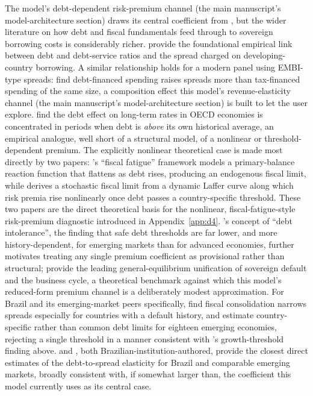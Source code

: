 \documentclass[11pt,a4paper]{article}
\begin{document}
The model's debt-dependent risk-premium channel (the main manuscript's model-architecture section) draws its central coefficient from \citet{baldaccikumar2010}, but the wider literature on how debt and fiscal fundamentals feed through to sovereign borrowing costs is considerably richer. \citet{edwards1984,edwards1986} provide the foundational empirical link between debt and debt-service ratios and the spread charged on developing-country borrowing. A similar relationship holds for a modern panel using EMBI-type spreads: \citet{akitobystratmann2008} find debt-financed spending raises spreads more than tax-financed spending of the same size, a composition effect this model's revenue-elasticity channel (the main manuscript's model-architecture section) is built to let the user explore. \citet{ardagnacasellilane2007} find the debt effect on long-term rates in OECD economies is concentrated in periods when debt is \emph{above} its own historical average, an empirical analogue, well short of a structural model, of a nonlinear or threshold-dependent premium. The explicitly nonlinear theoretical case is made most directly by two papers: \citet{ghoshkimmendozaostryqureshi2013}'s ``fiscal fatigue'' framework models a primary-balance reaction function that flattens as debt rises, producing an endogenous fiscal limit, while \citet{bi2012} derives a stochastic fiscal limit from a dynamic Laffer curve along which risk premia rise nonlinearly once debt passes a country-specific threshold. These two papers are the direct theoretical basis for the nonlinear, fiscal-fatigue-style risk-premium diagnostic introduced in Appendix~\ref{app:d4}. \citet{reinhartrogoffsavastano2003}'s concept of ``debt intolerance'', the finding that safe debt thresholds are far lower, and more history-dependent, for emerging markets than for advanced economies, further motivates treating any single premium coefficient as provisional rather than structural; \citet{mendozayue2012} provide the leading general-equilibrium unification of sovereign default and the business cycle, a theoretical benchmark against which this model's reduced-form premium channel is a deliberately modest approximation. For Brazil and its emerging-market peers specifically, \citet{guptamatibaldacci2008} find fiscal consolidation narrows spreads especially for countries with a default history, and \citet{camposcysne2021} estimate country-specific rather than common debt limits for eighteen emerging economies, rejecting a single threshold in a manner consistent with \citet{egert2015}'s growth-threshold finding above. \citet{ornelas2017} and \citet{rochamoreira2012}, both Brazilian-institution-authored, provide the closest direct estimates of the debt-to-spread elasticity for Brazil and comparable emerging markets, broadly consistent with, if somewhat larger than, the \citet{baldaccikumar2010} coefficient this model currently uses as its central case.
\end{document}
